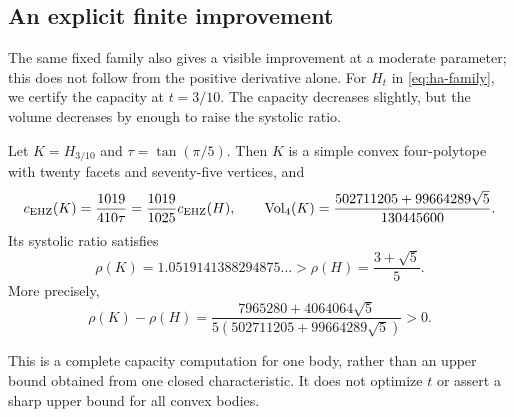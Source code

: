 \subsection{An explicit finite improvement}
\label{subsec:hko-finite-improvement}

The same fixed family also gives a visible improvement at a moderate
parameter; this does not follow from the positive derivative alone.
For $H_t$ in \eqref{eq:ha-family}, we certify the capacity at $t=3/10$.
The capacity decreases slightly, but the volume decreases by enough to raise
the systolic ratio.

\begin{theorem}
\label{thm:hko-finite-improvement}
Let $K=H_{3/10}$ and $\tau=\tan(\pi/5)$. Then $K$ is a simple convex
four-polytope with twenty facets and seventy-five vertices, and
\[
 c_{\mathrm{EHZ}}(K)=\frac{1019}{410\tau}
           =\frac{1019}{1025}c_{\mathrm{EHZ}}(H),\qquad
 \operatorname{Vol}_4(K)=\frac{502711205+99664289\sqrt5}{130445600}.
\]
Its systolic ratio satisfies
\[
 \rho(K)=1.0519141388294875\ldots
        >\rho(H)=\frac{3+\sqrt5}{5}.
\]
More precisely,
\[
 \rho(K)-\rho(H)
 =\frac{7965280+4064064\sqrt5}
        {5(502711205+99664289\sqrt5)}>0.
\]
\end{theorem}

This is a complete capacity computation for one body, rather than an
upper bound obtained from one closed characteristic. It does not optimize
$t$ or assert a sharp upper bound for all convex bodies.

